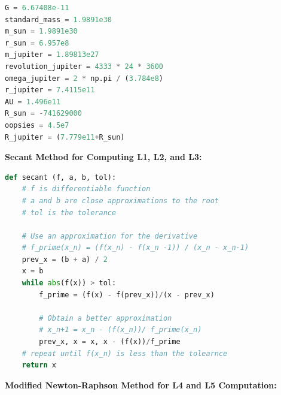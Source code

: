 \documentclass[linenumbers,RNAAS,trackchanges]{aastex631}
\begin{document}
\begin{lstlisting}[language=Python]
G = 6.67408e-11
standard_mass = 1.9891e30
m_sun = 1.9891e30
r_sun = 6.957e8
m_jupiter = 1.89813e27
revolution_jupiter = 4333 * 24 * 3600
omega_jupiter = 2 * np.pi / (3.784e8)
r_jupiter = 7.4115e11
AU = 1.496e11
R_sun = -741629000
oopsies = 4.5e7
R_jupiter = (7.779e11+R_sun)
\end{lstlisting}
\newpage
\begin{center} \textbf{Secant Method for Computing L1, L2, and L3:} \end{center}

\begin{lstlisting}[language=Python]
def secant (f, a, b, tol):
    # f is differentiable function
    # a and b are close approximations to the root
    # tol is the tolerance

    # Use an approximation for the derivative
    # f_prime(x_n) = (f(x_n) - f(x_n -1)) / (x_n - x_n-1)
    prev_x = (b + a) / 2
    x = b
    while abs(f(x)) > tol:
        f_prime = (f(x) - f(prev_x))/(x - prev_x)

        # Obtain a better approximation
        # x_n+1 = x_n - (f(x_n))/ f_prime(x_n)
        prev_x, x = x, x - (f(x))/f_prime
    # repeat until f(x_n) is less than the tolearnce
    return x
\end{lstlisting}

\begin{center} \textbf{Modified Newton-Raphson Method for L4 and L5 Computation:} \end{center}
\end{document}

